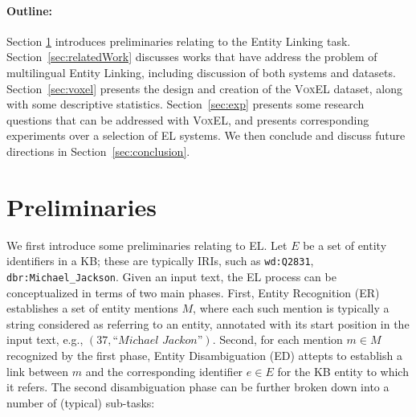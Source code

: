 \documentclass{llncs}
\begin{document}
\paragraph{Outline:} Section \ref{subsect:preliminaries} introduces preliminaries relating to the Entity Linking task. Section~\ref{sec:relatedWork} discusses works that have address the problem of multilingual Entity Linking, including discussion of both systems and datasets. Section~\ref{sec:voxel} presents the design and creation of the \textsc{VoxEL} dataset, along with some descriptive statistics. Section~\ref{sec:exp} presents some research questions that can be addressed with \textsc{VoxEL}, and presents corresponding experiments over a selection of EL systems. We then conclude and discuss future directions in Section~\ref{sec:conclusion}.


\section{Preliminaries}
\label{subsect:preliminaries}

We first introduce some preliminaries relating to EL. Let $E$ be a set of entity identifiers in a KB; these are typically IRIs, such as \texttt{wd:Q2831}, \texttt{dbr:Michael\_Jackson}. Given an input text, the EL process can be conceptualized in terms of two main phases. First, Entity Recognition (ER) establishes a set of entity mentions $M$, where each such mention is typically a string considered as referring to an entity, annotated with its start position in the input text, e.g., $(37,\textit{``Michael Jackon''})$. Second, for each mention $m\in{}M$ recognized by the first phase, Entity Disambiguation (ED) attepts to establish a link between $m$ and the corresponding identifier $e\in{}E$ for the KB entity to which it refers. The second disambiguation phase can be further broken down into a number of (typical) sub-tasks:
\end{document}
